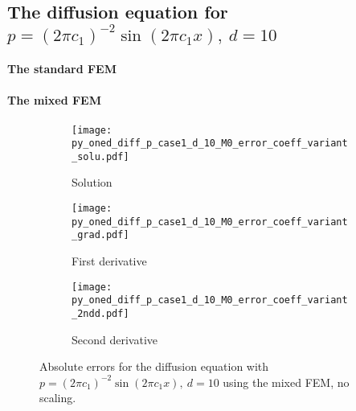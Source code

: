 \documentclass[review,3p]{elsarticle}
\begin{document}
\subsection{\texorpdfstring{The diffusion equation for $p=(2\pi c_1)^{-2}\sin(2\pi c_1x),~d=10$}{The diffusion equation for p=(2pic1){-2}sin(2pic1x), d=10}}

\paragraph{The standard FEM}

\paragraph{The mixed FEM}

\begin{figure}[!ht]
    \begin{subfigure}{5.5cm}
        \texttt{[image: py\_oned\_diff\_p\_case1\_d\_10\_M0\_error\_coeff\_variant\_solu.pdf]}
        \caption{Solution}
        \label{py_oned_diff_p_case1_d_10_M0_error_coeff_variant_solu}
    \end{subfigure}
    \hspace{-0.2cm}
    \begin{subfigure}{5.5cm}
        \texttt{[image: py\_oned\_diff\_p\_case1\_d\_10\_M0\_error\_coeff\_variant\_grad.pdf]}
        \caption{First derivative}
        \label{py_oned_diff_p_case1_d_10_M0_error_coeff_variant_grad}
    \end{subfigure}
    \hspace{-0.2cm}
    \begin{subfigure}{5.5cm}
        \texttt{[image: py\_oned\_diff\_p\_case1\_d\_10\_M0\_error\_coeff\_variant\_2ndd.pdf]}
        \caption{Second derivative}
        \label{py_oned_diff_p_case1_d_10_M0_error_coeff_variant_2ndd}
    \end{subfigure}
\caption{Absolute errors for the diffusion equation with $p=(2\pi c_1)^{-2}\sin(2\pi c_1x),~d=10$ using the mixed FEM, no scaling.}
\label{py_oned_diff_p_case1_d_10_M0_error_coeff_variant}
\end{figure}
\end{document}
